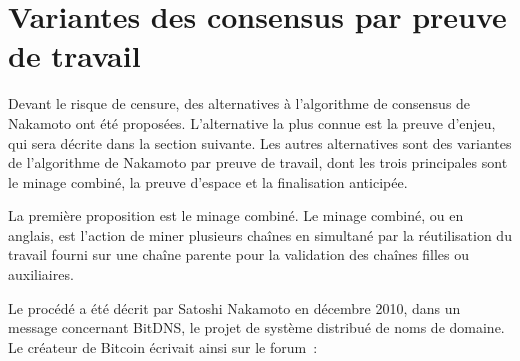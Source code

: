 \section*{Variantes des consensus par preuve de travail}

Devant le risque de censure, des alternatives à l'algorithme de consensus de Nakamoto ont été proposées. L'alternative la plus connue est la preuve d'enjeu, qui sera décrite dans la section suivante. Les autres alternatives sont des variantes de l'algorithme de Nakamoto par preuve de travail, dont les trois principales sont le minage combiné, la preuve d'espace et la finalisation anticipée. %


La première proposition est le minage combiné. Le minage combiné, ou  en anglais, est l'action de miner plusieurs chaînes en simultané par la réutilisation du travail fourni sur une chaîne parente pour la validation des chaînes filles ou auxiliaires.

Le procédé a été décrit par Satoshi Nakamoto en décembre 2010, dans un message concernant BitDNS, le projet de système distribué de noms de domaine. Le créateur de Bitcoin écrivait ainsi sur le forum~:

